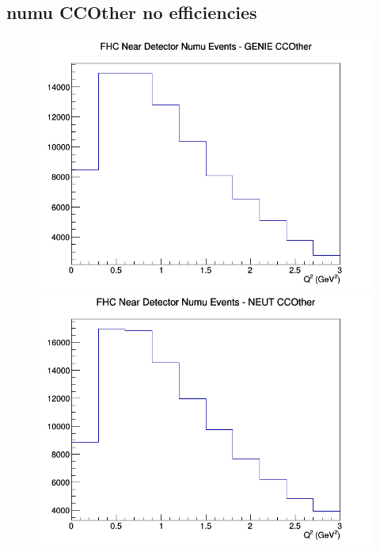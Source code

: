 \subsection{numu CCOther no efficiencies}
\begin{figure}[h]
\includegraphics[width=\linewidth]{Q2/nominal/CCOther_FHC_ND_numu_Q2_GENIE.png}
\endminipage
{}
\includegraphics[width=\linewidth]{Q2/nominal/CCOther_FHC_ND_numu_Q2_NEUT.png}
\endminipage
{}

\end{figure}
